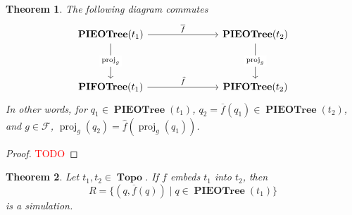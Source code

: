 \documentclass{amsart}
\DeclareMathOperator{\proj}{\mathrm{proj}}
\DeclareMathOperator{\Topo}{\mathbf{Topo}}
\DeclareMathOperator{\PIEOTree}{\mathbf{PIEOTree}}
\DeclareMathOperator{\PIFOTree}{\mathbf{PIFOTree}}
\newtheorem{thm}{Theorem}[section]
\theoremstyle{definition}
\begin{document}
\begin{thm}
    \label{thm:cd}
    The following diagram commutes
    $$
    \begin{tikzcd}
    	{\PIEOTree(t_1)} &&& {\PIEOTree(t_2)} \\
    	\\
    	{\PIFOTree(t_1)} &&& {\PIFOTree(t_2)}
    	\arrow["{\overline{f}}", from=1-1, to=1-4]
    	\arrow["{\proj_g}"{description}, from=1-1, to=3-1]
    	\arrow["{\proj_g}"{description}, from=1-4, to=3-4]
    	\arrow["{\widehat{f}}", from=3-1, to=3-4]
    \end{tikzcd}
    $$
    In other words, for $q_1 \in \PIEOTree(t_1)$, $q_2 = \overline{f}(q_1) \in \PIEOTree(t_2)$, and $g \in \mathcal F$, $\proj_g(q_2) = \widehat{f}(\proj_g(q_1))$.
\end{thm}

\begin{proof}
    \textcolor{red}{TODO}
\end{proof}

\begin{thm}
    \label{thm:profit}
    Let $t_1, t_2 \in \Topo$. If $f$ embeds $t_1$ into $t_2$, then 
    $$R = \{(q, \overline{f}(q)) \mid q \in \PIEOTree(t_1)\}$$ 
    is a simulation.
\end{thm}
\end{document}
